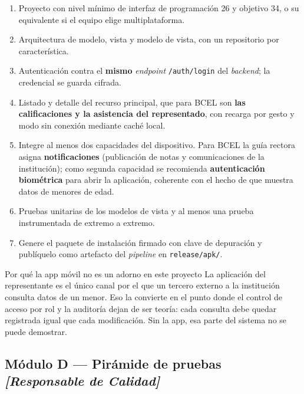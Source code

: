 \documentclass[11pt,a4paper]{article}
\begin{document}
\begin{enumerate}[leftmargin=*,itemsep=3pt]
	\item Proyecto con nivel mínimo de interfaz de programación 26 y objetivo 34, o su equivalente si el equipo elige multiplataforma.
	\item Arquitectura de modelo, vista y modelo de vista, con un repositorio por característica.
	\item Autenticación contra el \textbf{mismo} \emph{endpoint} \texttt{/auth/login} del \emph{backend}; la credencial se guarda cifrada.
	\item Listado y detalle del recurso principal, que para BCEL son \textbf{las calificaciones y la asistencia del representado}, con recarga por gesto y modo sin conexión mediante caché local.
	\item Integre al menos dos capacidades del dispositivo. Para BCEL la guía rectora asigna \textbf{notificaciones} (publicación de notas y comunicaciones de la institución); como segunda capacidad se recomienda \textbf{autenticación biométrica} para abrir la aplicación, coherente con el hecho de que muestra datos de menores de edad.
	\item Pruebas unitarias de los modelos de vista y al menos una prueba instrumentada de extremo a extremo.
	\item Genere el paquete de instalación firmado con clave de depuración y publíquelo como artefacto del \emph{pipeline} en \texttt{release/apk/}.
\end{enumerate}

\begin{defBox}{Por qué la app móvil no es un adorno en este proyecto}
	La aplicación del representante es el único canal por el que un tercero externo a la institución consulta datos de un menor. Eso la convierte en el punto donde el control de acceso por rol y la auditoría dejan de ser teoría: cada consulta debe quedar registrada igual que cada modificación. Sin la app, esa parte del sistema no se puede demostrar.
\end{defBox}

\subsection{Módulo D --- Pirámide de pruebas \emph{[Responsable de Calidad]}}
\end{document}
